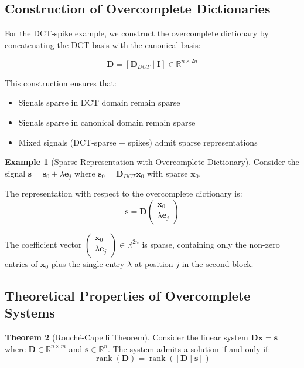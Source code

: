 \documentclass[12pt]{article}
\renewcommand{\vec}[1]{\mathbf{#1}}
\DeclareMathOperator{\rank}{rank}
\newcommand{\R}{\mathbb{R}}
\theoremstyle{definition}
\newtheorem{theorem}{Theorem}[section]
\newtheorem{example}[theorem]{Example}
\begin{document}
\subsection{Construction of Overcomplete Dictionaries}

For the DCT-spike example, we construct the overcomplete dictionary by concatenating the DCT basis with the canonical basis:

\begin{equation}
    \mathbf{D} = [\mathbf{D}_{DCT} \mid \mathbf{I}] \in \R^{n \times 2n}
\end{equation}

This construction ensures that:
\begin{itemize}
    \item Signals sparse in DCT domain remain sparse
    \item Signals sparse in canonical domain remain sparse
    \item Mixed signals (DCT-sparse + spikes) admit sparse representations
\end{itemize}

\begin{example}[Sparse Representation with Overcomplete Dictionary]
    Consider the signal $\vec{s} = \vec{s}_0 + \lambda \vec{e}_j$ where $\vec{s}_0 = \mathbf{D}_{DCT} \vec{x}_0$ with sparse $\vec{x}_0$.

    The representation with respect to the overcomplete dictionary is:
    \begin{equation}
        \vec{s} = \mathbf{D} \begin{pmatrix} \vec{x}_0 \\ \lambda \vec{e}_j \end{pmatrix}
    \end{equation}

    The coefficient vector $\begin{pmatrix} \vec{x}_0 \\ \lambda \vec{e}_j \end{pmatrix} \in \R^{2n}$ is sparse, containing only the non-zero entries of $\vec{x}_0$ plus the single entry $\lambda$ at position $j$ in the second block.
\end{example}

\subsection{Theoretical Properties of Overcomplete Systems}

\begin{theorem}[Rouché-Capelli Theorem]
    \label{thm:rouche}
    Consider the linear system $\mathbf{D}\vec{x} = \vec{s}$ where $\mathbf{D} \in \R^{n \times m}$ and $\vec{s} \in \R^n$. The system admits a solution if and only if:
    \begin{equation}
        \rank(\mathbf{D}) = \rank([\mathbf{D} \mid \vec{s}])
    \end{equation}
\end{theorem}
\end{document}
